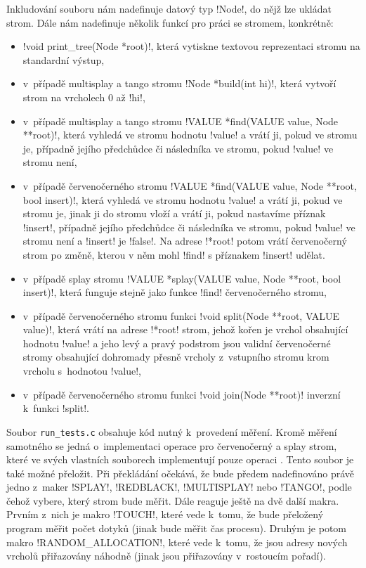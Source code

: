 Inkludování souboru nám nadefinuje datový typ !Node!, do nějž lze ukládat strom. Dále nám nadefinuje několik funkcí pro práci se stromem, konkrétně:

\begin{itemize}
\item !void print_tree(Node *root)!, která vytiskne textovou reprezentaci stromu na standardní výstup,
\item v~případě multisplay a tango stromu !Node *build(int hi)!, která vytvoří strom na vrcholech 0 až !hi!,
\item v~případě multisplay a tango stromu !VALUE *find(VALUE value, Node **root)!, která vyhledá ve stromu hodnotu !value! a vrátí ji, pokud ve stromu je, případně jejího předchůdce či následníka ve stromu, pokud !value! ve stromu není,
\item v~případě červenočerného stromu !VALUE *find(VALUE value, Node **root, bool insert)!, která vyhledá ve stromu hodnotu !value! a vrátí ji, pokud ve stromu je, jinak ji do stromu vloží a vrátí ji, pokud nastavíme příznak !insert!, případně jejího předchůdce či následníka ve stromu, pokud !value! ve stromu není a !insert! je !false!. Na adrese !*root! potom vrátí červenočerný strom po změně, kterou v něm mohl !find! s příznakem !insert! udělat.
\item v~případě splay stromu !VALUE *splay(VALUE value, Node **root, bool insert)!, která funguje stejně jako funkce !find! červenočerného stromu,
\item v~případě červenočerného stromu funkci !void split(Node **root, VALUE value)!, která vrátí na adrese !*root! strom, jehož kořen je vrchol obsahující hodnotu !value! a jeho levý a pravý podstrom jsou validní červenočerné stromy obsahující dohromady přesně vrcholy z~vstupního stromu krom vrcholu s~hodnotou !value!,
\item v~případě červenočerného stromu funkci !void join(Node **root)! inverzní k~funkci !split!.
\end{itemize}

Soubor {\tt run_tests.c} obsahuje kód nutný k~provedení měření. Kromě měření
samotného se jedná o~implementaci operace  pro červenočerný a splay
strom, které ve svých vlastních souborech implementují pouze operaci
. Tento soubor je také možné přeložit. Při překládání očekává, že
bude předem nadefinováno právě jedno z~maker !SPLAY!, !REDBLACK!, !MULTISPLAY!
nebo !TANGO!, podle čehož vybere, který strom bude měřit. Dále reaguje ještě na
dvě další makra. Prvním z~nich je makro !TOUCH!, které vede k~tomu, že bude
přeložený program měřit počet dotyků (jinak bude měřit čas procesu). Druhým je
potom makro !RANDOM_ALLOCATION!, které vede k~tomu, že jsou adresy nových
vrcholů přiřazovány náhodně (jinak jsou přiřazovány v~rostoucím pořadí).

